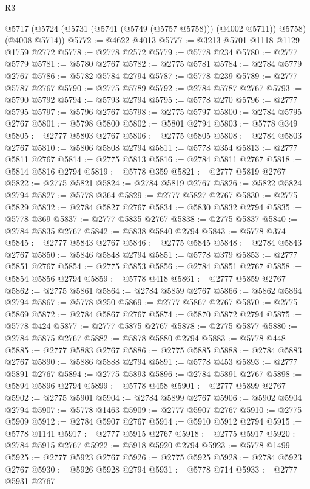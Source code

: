 \begin{lexlean}{R3}
\begin{coremodule}
    @5717 (@5724 (@5731 (@5741 (@5749 (@5757 @5758))) (@4002 @5711)) @5758) (@4008 @5714))
@5772 := @4622 @4013
@5777 := @3213 @5701 @1118 @1129 @1759 @2772
@5778 := @2778 @2572
@5779 := @5778 @234
@5780 := @2777 @5779
@5781 := @5780 @2767
@5782 := @2775 @5781
@5784 := @2784 @5779 @2767
@5786 := @5782 @5784 @2794
@5787 := @5778 @239
@5789 := @2777 @5787 @2767
@5790 := @2775 @5789
@5792 := @2784 @5787 @2767
@5793 := @5790 @5792
@5794 := @5793 @2794
@5795 := @5778 @270
@5796 := @2777 @5795
@5797 := @5796 @2767
@5798 := @2775 @5797
@5800 := @2784 @5795 @2767
@5801 := @5798 @5800
@5802 := @5801 @2794
@5803 := @5778 @349
@5805 := @2777 @5803 @2767
@5806 := @2775 @5805
@5808 := @2784 @5803 @2767
@5810 := @5806 @5808 @2794
@5811 := @5778 @354
@5813 := @2777 @5811 @2767
@5814 := @2775 @5813
@5816 := @2784 @5811 @2767
@5818 := @5814 @5816 @2794
@5819 := @5778 @359
@5821 := @2777 @5819 @2767
@5822 := @2775 @5821
@5824 := @2784 @5819 @2767
@5826 := @5822 @5824 @2794
@5827 := @5778 @364
@5829 := @2777 @5827 @2767
@5830 := @2775 @5829
@5832 := @2784 @5827 @2767
@5834 := @5830 @5832 @2794
@5835 := @5778 @369
@5837 := @2777 @5835 @2767
@5838 := @2775 @5837
@5840 := @2784 @5835 @2767
@5842 := @5838 @5840 @2794
@5843 := @5778 @374
@5845 := @2777 @5843 @2767
@5846 := @2775 @5845
@5848 := @2784 @5843 @2767
@5850 := @5846 @5848 @2794
@5851 := @5778 @379
@5853 := @2777 @5851 @2767
@5854 := @2775 @5853
@5856 := @2784 @5851 @2767
@5858 := @5854 @5856 @2794
@5859 := @5778 @418
@5861 := @2777 @5859 @2767
@5862 := @2775 @5861
@5864 := @2784 @5859 @2767
@5866 := @5862 @5864 @2794
@5867 := @5778 @250
@5869 := @2777 @5867 @2767
@5870 := @2775 @5869
@5872 := @2784 @5867 @2767
@5874 := @5870 @5872 @2794
@5875 := @5778 @424
@5877 := @2777 @5875 @2767
@5878 := @2775 @5877
@5880 := @2784 @5875 @2767
@5882 := @5878 @5880 @2794
@5883 := @5778 @448
@5885 := @2777 @5883 @2767
@5886 := @2775 @5885
@5888 := @2784 @5883 @2767
@5890 := @5886 @5888 @2794
@5891 := @5778 @453
@5893 := @2777 @5891 @2767
@5894 := @2775 @5893
@5896 := @2784 @5891 @2767
@5898 := @5894 @5896 @2794
@5899 := @5778 @458
@5901 := @2777 @5899 @2767
@5902 := @2775 @5901
@5904 := @2784 @5899 @2767
@5906 := @5902 @5904 @2794
@5907 := @5778 @1463
@5909 := @2777 @5907 @2767
@5910 := @2775 @5909
@5912 := @2784 @5907 @2767
@5914 := @5910 @5912 @2794
@5915 := @5778 @1141
@5917 := @2777 @5915 @2767
@5918 := @2775 @5917
@5920 := @2784 @5915 @2767
@5922 := @5918 @5920 @2794
@5923 := @5778 @1499
@5925 := @2777 @5923 @2767
@5926 := @2775 @5925
@5928 := @2784 @5923 @2767
@5930 := @5926 @5928 @2794
@5931 := @5778 @714
@5933 := @2777 @5931 @2767

\end{coremodule}
\end{lexlean}
